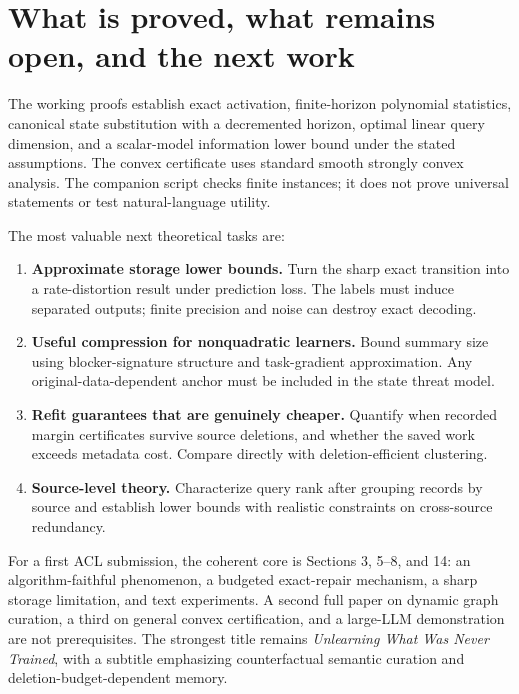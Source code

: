 \documentclass[11pt,a4paper]{article}
\theoremstyle{definition}\newtheorem{definition}[theorem]{Definition}
\begin{document}
\section{What is proved, what remains open, and the next work}
The working proofs establish exact activation, finite-horizon polynomial statistics, canonical state substitution with a decremented horizon, optimal linear query dimension, and a scalar-model information lower bound under the stated assumptions. The convex certificate uses standard smooth strongly convex analysis. The companion script checks finite instances; it does not prove universal statements or test natural-language utility.

The most valuable next theoretical tasks are:
\begin{enumerate}
\item \textbf{Approximate storage lower bounds.} Turn the sharp exact transition into a rate-distortion result under prediction loss. The labels must induce separated outputs; finite precision and noise can destroy exact decoding.
\item \textbf{Useful compression for nonquadratic learners.} Bound summary size using blocker-signature structure and task-gradient approximation. Any original-data-dependent anchor must be included in the state threat model.
\item \textbf{Refit guarantees that are genuinely cheaper.} Quantify when recorded margin certificates survive source deletions, and whether the saved work exceeds metadata cost. Compare directly with deletion-efficient clustering.
\item \textbf{Source-level theory.} Characterize query rank after grouping records by source and establish lower bounds with realistic constraints on cross-source redundancy.
\end{enumerate}

For a first ACL submission, the coherent core is Sections 3, 5--8, and 14: an algorithm-faithful phenomenon, a budgeted exact-repair mechanism, a sharp storage limitation, and text experiments. A second full paper on dynamic graph curation, a third on general convex certification, and a large-LLM demonstration are not prerequisites. The strongest title remains \emph{Unlearning What Was Never Trained}, with a subtitle emphasizing counterfactual semantic curation and deletion-budget-dependent memory.

\appendix
\end{document}
